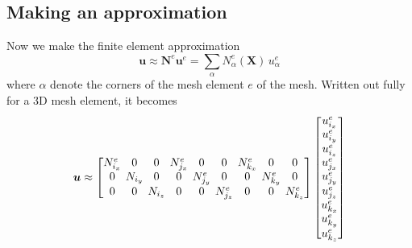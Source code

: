 \documentclass[acmtog]{acmart}
\begin{document}
\subsection{Making an approximation}
Now we make the finite element approximation
%
\begin{equation}
  \boldsymbol u \approx \boldsymbol N^e \boldsymbol u^e = \sum_\alpha N_\alpha^e(\boldsymbol X) \,u_\alpha^e
\end{equation}
%
where $\alpha$ denote the corners of the mesh element $e$ of the mesh. Written out fully for a 3D mesh element, it becomes
%
\begin{align}
  \boldsymbol u \approx
  \begin{bmatrix}
    N_{i_x}^e \hspace{-6pt} & 0       \hspace{-6pt} & 0       \hspace{-6pt} & N_{j_x}^e \hspace{-6pt} & 0         \hspace{-6pt} & 0         \hspace{-6pt} & N_{k_x}^e \hspace{-6pt} & 0         \hspace{-6pt} & 0         \\
    0         \hspace{-6pt} & N_{i_y} \hspace{-6pt} & 0       \hspace{-6pt} & 0         \hspace{-6pt} & N_{j_y}^e \hspace{-6pt} & 0         \hspace{-6pt} & 0         \hspace{-6pt} & N_{k_y}^e \hspace{-6pt} & 0         \\
    0         \hspace{-6pt} & 0       \hspace{-6pt} & N_{i_z} \hspace{-6pt} & 0         \hspace{-6pt} & 0         \hspace{-6pt} & N_{j_z}^e \hspace{-6pt} & 0         \hspace{-6pt} & 0         \hspace{-6pt} & N_{k_z}^e
  \end{bmatrix}
  \begin{bmatrix}
    u_{i_x}^e \\
    u_{i_y}^e \\
    u_{i_z}^e \\
    u_{j_x}^e \\
    u_{j_y}^e \\
    u_{j_z}^e \\
    u_{k_x}^e \\
    u_{k_y}^e \\
    u_{k_z}^e
  \end{bmatrix}
\end{align}
%
\end{document}

